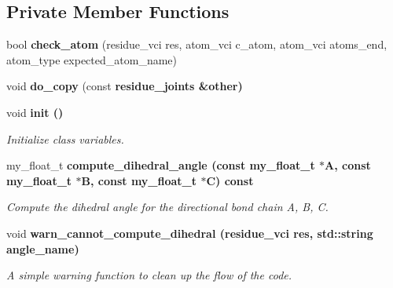 \subsection*{Private Member Functions}
\begin{CompactItemize}
\item 
bool \textbf{check\_\-atom} (residue\_\-vci res, atom\_\-vci c\_\-atom, atom\_\-vci atoms\_\-end, atom\_\-type expected\_\-atom\_\-name)\label{classASCbase_1_1residue__joints_50f6fddea71680a7b814c8a1bf81e9c5}

\item 
void \textbf{do\_\-copy} (const \bf{residue\_\-joints} \&other)\label{classASCbase_1_1residue__joints_c48e538e71f2124731442e6d045710d5}

\item 
void \bf{init} ()\label{classASCbase_1_1residue__joints_8b3d0cf768de75423ff97aefdac11477}

\begin{CompactList}\small\item\em Initialize class variables. \item\end{CompactList}\item 
my\_\-float\_\-t \bf{compute\_\-dihedral\_\-angle} (const my\_\-float\_\-t $\ast$A, const my\_\-float\_\-t $\ast$B, const my\_\-float\_\-t $\ast$C) const 
\begin{CompactList}\small\item\em Compute the dihedral angle for the directional bond chain A, B, C. \item\end{CompactList}\item 
void \bf{warn\_\-cannot\_\-compute\_\-dihedral} (residue\_\-vci res, std::string angle\_\-name)\label{classASCbase_1_1residue__joints_49fe835a4836859911cf6ce15b275b51}

\begin{CompactList}\small\item\em A simple warning function to clean up the flow of the code. \item\end{CompactList}\end{CompactItemize}
